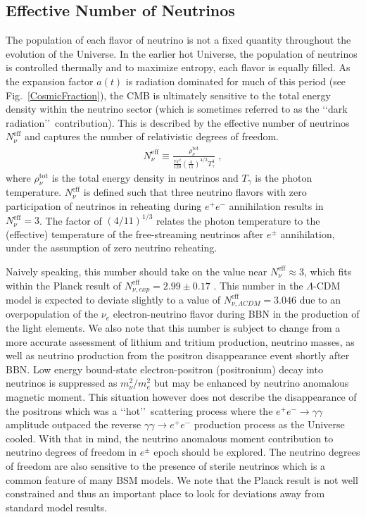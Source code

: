 \documentclass[universe,article,submit,moreauthors,pdftex,a4paper]{Definitions/mdpi}
\newcommand*{\rf}[1]{Fig.~{\ref{#1}}}
\begin{document}
\subsection{Effective Number of Neutrinos}\label{sec:EffectiveNeutrino}
\noindent The population of each flavor of neutrino is not a fixed quantity throughout the evolution of the Universe. In the earlier hot Universe, the population of neutrinos is controlled thermally and to maximize entropy, each flavor is equally filled. As the expansion factor $a(t)$ is radiation dominated for much of this period (see \rf{CosmicFraction}), the CMB is ultimately sensitive to the total energy density within the neutrino sector (which is sometimes referred to as the \lq\lq dark radiation\rq\rq\ contribution). This is described by the effective number of neutrinos $N_{\nu}^{\mathrm{eff}}$ and captures the number of relativistic degrees of freedom.
\begin{align}\label{Neff}
N_\nu^{\mathrm{eff}}\equiv\frac{\rho^{\mathrm{tot}}_\nu}{\frac{7\pi^2}{120}\left(\frac{4}{11}\right)^{4/3}T_\gamma^4}\;,
\end{align}
where $\rho_\nu^{\mathrm{tot}}$ is the total energy density in neutrinos and $T_\gamma$ is the photon temperature. $N_\nu^{\mathrm{eff}}$ is defined such that three neutrino flavors with zero participation of neutrinos in reheating during $e^+e^-$ annihilation results in $N_\nu^{\mathrm{eff}}=3$. The factor of $\left(4/11\right)^{1/3}$ relates the photon temperature to the (effective) temperature of the free-streaming neutrinos \cite{Coleman:2003hs} after $e^\pm$ annihilation, under the assumption of zero neutrino reheating.

Naively speaking, this number should take on the value near $N_{\nu}^{\mathrm{eff}}\approx3$, which fits within the Planck result of $N_{\nu, exp}^{\mathrm{eff}}=2.99\pm0.17$ \cite{Planck:2018vyg}. This number in the $\Lambda$-CDM model is expected to deviate slightly to a value of $N_{\nu, \Lambda CDM}^{\mathrm{eff}}=3.046$ due to an overpopulation of the $\nu_{e}$ electron-neutrino flavor during BBN in the production of the light elements. We also note that this number is subject to change from a more accurate assessment of lithium and tritium production, neutrino masses, as well as neutrino production from the positron disappearance event shortly after BBN. Low energy bound-state electron-positron (positronium) decay into neutrinos is suppressed as $m_{\nu}^{2}/m_{e}^{2}$ \cite{Govaerts:1996dt,Adkins:2022omi} but may be enhanced by neutrino anomalous magnetic moment. This situation however does not describe the disappearance of the positrons which was a \lq\lq hot\rq\rq\ scattering process where the $e^{+}e^{-}\rightarrow\gamma\gamma$ amplitude outpaced the reverse $\gamma\gamma\rightarrow e^{+}e^{-}$ production process as the Universe cooled. With that in mind, the neutrino anomalous moment contribution to neutrino degrees of freedom in $e^{\pm}$ epoch should be explored. The neutrino degrees of freedom are also sensitive to the presence of sterile neutrinos \cite{Joudaki:2012uk,Birrell:2014uka} which is a common feature of many BSM models. We note that the Planck result is not well constrained and thus an important place to look for deviations away from standard model results.
\end{document}
